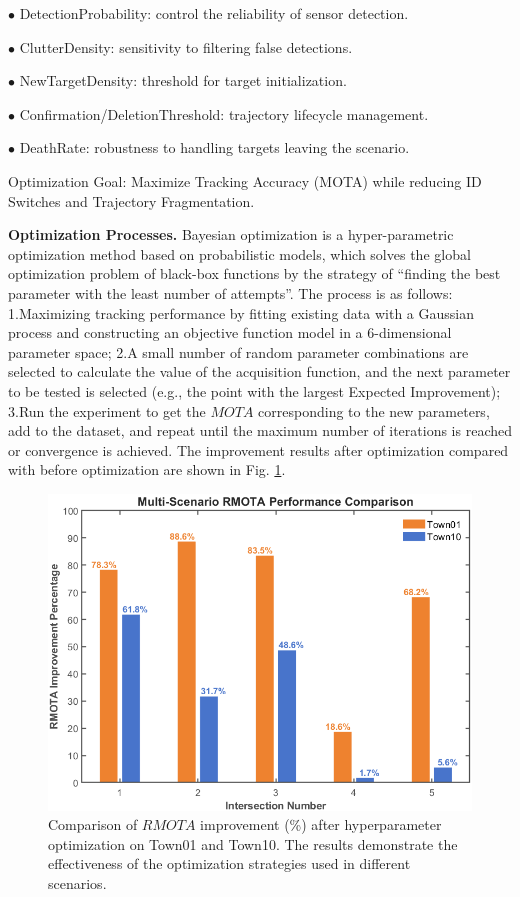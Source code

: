 \documentclass[lettersize,journal]{IEEEtran}
\begin{document}
\(\bullet\) DetectionProbability: control the reliability of sensor detection.

\(\bullet\) ClutterDensity: sensitivity to filtering false detections.

\(\bullet\) NewTargetDensity: threshold for target initialization.

\(\bullet\) Confirmation/DeletionThreshold: trajectory lifecycle management.

\(\bullet\) DeathRate: robustness to handling targets leaving the scenario.

Optimization Goal: Maximize Tracking Accuracy (MOTA) while reducing ID Switches and Trajectory Fragmentation.

\textbf{Optimization Processes.}
Bayesian optimization is a hyper-parametric optimization method based on probabilistic models, which solves the global optimization problem of black-box functions by the strategy of “finding the best parameter with the least number of attempts”.
The process is as follows:
1.Maximizing tracking performance by fitting existing data with a Gaussian process and constructing an objective function model in a 6-dimensional parameter space; 
2.A small number of random parameter combinations are selected to calculate the value of the acquisition function, and the next parameter to be tested is selected (e.g., the point with the largest Expected Improvement); 
3.Run the experiment to get the \(MOTA\) corresponding to the new parameters, add to the dataset, and repeat until the maximum number of iterations is reached or convergence is achieved.
The improvement results after optimization compared with before optimization are shown in Fig. \ref{fig:4}.   
\begin{figure}[t]
	\centering
	\includegraphics[width=\linewidth]{picture/picture4.png} 
	\caption{Comparison of \(RMOTA\) improvement (\%) after hyperparameter optimization on Town01 and Town10. The results demonstrate the effectiveness of the optimization strategies used in different scenarios.} 
	\label{fig:4} 
\end{figure}
\end{document}
